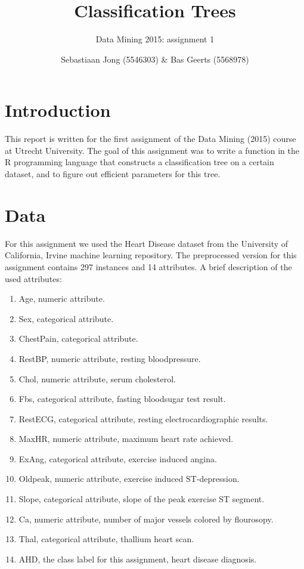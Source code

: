 \documentclass[a4paper,12pt]{scrartcl}
\def\labelitemi{--}
\begin{document}
\title{Classification Trees}
\subtitle{Data Mining 2015: assignment 1}
\author{Sebastiaan Jong (5546303) \& Bas Geerts (5568978)}
\date{}
\maketitle
\section{Introduction}
This report is written for the first assignment of the Data Mining (2015) course at Utrecht University. The goal of this assignment was to write a function in the R programming language that constructs a classification tree on a certain dataset, and to figure out efficient parameters for this tree.
\section{Data}
For this assignment we used the Heart Disease dataset from the University of California, Irvine machine learning repository. The preprocessed version for this assignment contains 297 instances and 14 attributes. A brief description of the used attributes:
    \begin{enumerate} \itemsep0pt
        \renewcommand\labelitemi{--}
        \item Age, numeric attribute.
        \item Sex, categorical attribute.
        \item ChestPain, categorical attribute.
        \item RestBP, numeric attribute, resting bloodpressure.
        \item Chol, numeric attribute, serum cholesterol.
        \item Fbs, categorical attribute, fasting bloodsugar test result. 
        \item RestECG, categorical attribute, resting electrocardiographic results.
        \item MaxHR, numeric attribute, maximum heart rate achieved.
        \item ExAng, categorical attribute, exercise induced angina. 
        \item Oldpeak, numeric attribute, exercise induced ST-depression. 
        \item Slope, categorical attribute, slope of the peak exercise ST segment.
        \item Ca, numeric attribute, number of major vessels colored by flourosopy.
        \item Thal, categorical attribute, thallium heart scan.
        \item AHD, the class label for this assignment, heart disease diagnosis. 
    \end{enumerate}
\clearpage
\end{document}
